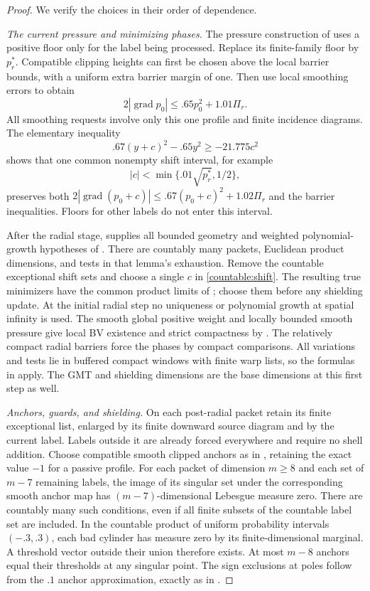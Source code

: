 \documentclass[11pt]{article}
\numberwithin{equation}{section}
\theoremstyle{definition}
\theoremstyle{remark}
\begin{document}
\begin{proof}
We verify the choices in their order of dependence.

\emph{The current pressure and minimizing phases.}
The pressure construction of  uses a positive floor
only for the label being processed. Replace its finite-family floor
by $p_r^*$. Compatible clipping heights can first be chosen above the
local barrier bounds, with a uniform extra barrier margin of one.
Then use local smoothing errors to obtain
\[
 2|\operatorname{grad} p_0|\le .65p_0^2+1.01\Pi_r.
\]
All smoothing requests involve only this one profile and finite
incidence diagrams. The elementary inequality
\[
 .67(y+c)^2-.65y^2\ge-21.775c^2
\]
shows that one common nonempty shift interval, for example
\begin{equation}\label{countable:shift}
 |c|<\min\{.01\sqrt{p_r^*},1/2\},
\end{equation}
preserves both $2|\operatorname{grad}(p_0+c)|\le .67(p_0+c)^2+1.02\Pi_r$ and
the barrier inequalities. Floors for other labels do not enter this
interval.

After the radial stage,  supplies all bounded
geometry and weighted polynomial-growth hypotheses of
. There are countably many packets,
Euclidean product dimensions, and tests in that lemma's exhaustion.
Remove the countable exceptional shift sets and choose a single $c$
in \eqref{countable:shift}. The resulting true minimizers have the
common product limits of ; choose them before
any shielding update. At the initial radial step no uniqueness or
polynomial growth at spatial infinity is used. The smooth global
positive weight and locally bounded smooth pressure give local BV
existence and strict compactness by . The
relatively compact radial barriers force the phases by compact
comparisons. All variations and tests lie in buffered compact windows
with finite warp lists, so the formulas in 
apply. The GMT and shielding dimensions are the base dimensions at
this first step as well.

\emph{Anchors, guards, and shielding.}
On each post-radial packet retain its finite exceptional list, enlarged
by its finite downward source diagram and by the current label.
Labels outside it are already forced everywhere and require no shell
addition. Choose compatible smooth clipped anchors as in
, retaining the exact value $-1$ for a passive
profile. For each packet of dimension $m\ge8$ and each set of $m-7$
remaining labels, the image of its singular set under the corresponding
smooth anchor map has $(m-7)$-dimensional Lebesgue measure zero.
There are countably many such conditions, even if all finite subsets
of the countable label set are included. In the countable product of
uniform probability intervals $(-.3,.3)$, each bad cylinder has
measure zero by its finite-dimensional marginal. A threshold vector
outside their union therefore exists. At most $m-8$ anchors equal
their thresholds at any singular point. The sign exclusions at poles
follow from the $.1$ anchor approximation, exactly as in
.


\end{proof}
\end{document}
